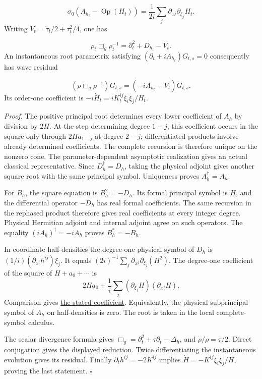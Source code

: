 \documentclass[
  english,
  11pt,
  reqno]{amsart}
\begin{document}
\label{eq:online-wave-root-subprincipal} \[
\sigma_0(A_{h_t}-\operatorname{Op}(H_t))
=\frac1{2i}\sum_j\partial_{x^j}\partial_{\xi_j}H_t.
\] Writing \(V_t=\dot\tau_t/2+\tau_t^2/4\), one has

\label{eq:online-wave-half-density-reduction} \[
\rho_t\Box_g\rho_t^{-1}
=\partial_t^2+D_{h_t}-V_t.
\] An instantaneous root parametrix satisfying
\((\partial_t+iA_{h_t})G_{t,s}=0\) consequently has wave residual

\label{eq:online-wave-instantaneous-defect} \[
(\rho\Box_g\rho^{-1})G_{t,s}
=(-i\dot A_{h_t}-V_t)G_{t,s}.
\] Its order-one coefficient is \(-i\dot H_t=iK_t^{ij}\xi_i\xi_j/H_t\).

\emph{Proof.} The positive principal root determines every lower
coefficient of \(A_h\) by division by \(2H\). At the step determining
degree \(1-j\), this coefficient occurs in the square only through
\(2H a_{1-j}\) at degree \(2-j\); differentiated products involve
already determined coefficients. The complete recursion is therefore
unique on the nonzero cone. The parameter-dependent asymptotic
realization gives an actual classical representative. Since
\(D_h^\dagger=D_h\), taking the physical adjoint gives another square
root with the same principal symbol. Uniqueness proves
\(A_h^\dagger=A_h\).

For \(B_h\), the square equation is \(B_h^2=-D_h\). Its formal principal
symbol is \(H\), and the differential operator \(-D_h\) has real formal
coefficients. The same recursion in the rephased product therefore gives
real coefficients at every integer degree. Physical Hermitian adjoint
and internal adjoint agree on such operators. The equality
\((iA_h)^\dagger=-iA_h\) proves \(B_h^*=-B_h\).

In coordinate half-densities the degree-one physical symbol of \(D_h\)
is \((1/i)(\partial_{x^i}h^{ij})\xi_j\). It equals
\((2i)^{-1}\sum_j\partial_{x^j}\partial_{\xi_j}(H^2)\). The degree-one
coefficient of the square of \(H+a_0+\cdots\) is \[
2Ha_0+\frac1i\sum_j
(\partial_{\xi_j}H)(\partial_{x^j}H).
\] Comparison gives \hyperref[eq:online-wave-root-subprincipal]{the
stated coefficient}. Equivalently, the physical subprincipal symbol of
\(A_h\) on half-densities is zero. The root is taken in the local
complete-symbol calculus.

The scalar divergence formula gives
\(\Box_g=\partial_t^2+\tau\partial_t-\Delta_h\), and
\(\dot\rho/\rho=\tau/2\). Direct conjugation gives the displayed
reduction. Twice differentiating the instantaneous evolution gives its
residual. Finally \(\partial_t h^{ij}=-2K^{ij}\) implies
\(\dot H=-K^{ij}\xi_i\xi_j/H\), proving the last statement.
\hfill\(\square\)
\end{document}
